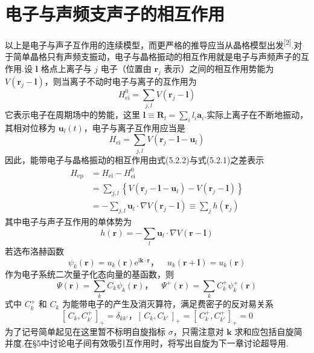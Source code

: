 \section{电子与声频支声子的相互作用}

以上是电子与声子互作用的连续模型，而更严格的推导应当从晶格模型出发\textsuperscript{[2]}.对于简单晶格只有声频支振动，电子与晶格振动的相互作用就是电子与声频声子的互作用.设 $\boldsymbol{l}$ 格点上离子与 $j$ 电子（位置由 $\boldsymbol{r}_j$ 表示）之间的相互作用势能为 $V\left(\boldsymbol{r}_j-\boldsymbol{l}\right)$，则当离子不动时电子与离子的互作用为
\begin{equation}
  H_{\mathrm{ei}}^{0}=\sum_{j,l}V\left(\boldsymbol{r}_j-\boldsymbol{l}\right)
\end{equation}
它表示电子在周期场中的势能，这里 $\boldsymbol{l}\equiv\boldsymbol{R}_l=\sum_{i}l_i\boldsymbol{a}_i$.实际上离子在不断地振动，其相对位移为 $\boldsymbol{u}_l\left(t\right)$，电子与离子互作用应当是
\begin{equation}
  H_{\mathrm{ei}}=\sum_{j,l}V\left(\boldsymbol{r}_j-\boldsymbol{l}-\boldsymbol{u}_l\right)
\end{equation}
因此，能带电子与晶格振动的相互作用由式(5.2.2)与式(5.2.1)之差表示
\begin{equation}
\begin{aligned}
  H_{\mathrm{ep}}&=H_{\mathrm{ei}}-H_{\mathrm{ei}}^{0}\\
  &=\sum_{j,l}\left\{V\left(\boldsymbol{r}_j-\boldsymbol{l}-\boldsymbol{u}_l\right)
  -V\left(\boldsymbol{r}_j-\boldsymbol{l}\right)\right\}\\
  &=-\sum_{j,l}\boldsymbol{u}_l\cdot\nabla V\left(\boldsymbol{r}_j-\boldsymbol{l}\right)
  \equiv\sum_{j}h\left(\boldsymbol{r}_j\right)
\end{aligned}
\end{equation}
其中电子与声子互作用的单体势为
\begin{equation}
  h\left(\boldsymbol{r}\right)=-\sum_{l}\boldsymbol{u}_l\cdot\nabla V\left(\boldsymbol{r}-\boldsymbol{l}\right)
\end{equation}
若选布洛赫函数
\begin{equation}
  \psi_k\left(\boldsymbol{r}\right)=u_k\left(\boldsymbol{r}\right)\mathrm{e}^{\mathrm{i}\boldsymbol{k}\cdot\boldsymbol{r}}
  \text{，}\quad u_k\left(\boldsymbol{r}+\boldsymbol{l}\right)=u_k\left(\boldsymbol{r}\right)
\end{equation}
作为电子系统二次量子化态向量的基函数，则
\begin{equation}
  \varPsi\left(\boldsymbol{r}\right)=\sum_{k}C_k\psi_k\left(\boldsymbol{r}\right)
  \text{，}\quad \varPsi^{+}\left(\boldsymbol{r}\right)=\sum_{k}C_k^{+}\psi_k^{+}\left(\boldsymbol{r}\right)
\end{equation}
式中 $C_k^{+}$ 和 $C_k$ 为能带电子的产生及消灭算符，满足费密子的反对易关系
\begin{equation}
  \left[\,C_k,C_{k'}^{+}\,\right]_{+}=\delta_{kk'}\text{，}
  \left[\,C_k,C_{k'}\,\right]_{+}=\left[\,C_k^{+},C_{k'}^{+}\,\right]_{+}=0
\end{equation}
为了记号简单起见在这里暂不标明自旋指标 $\sigma$，只需注意对 $\boldsymbol{k}$ 求和应包括自旋简并度.在§5中讨论电子间有效吸引互作用时，将写出自旋为下一章讨论超导用.

